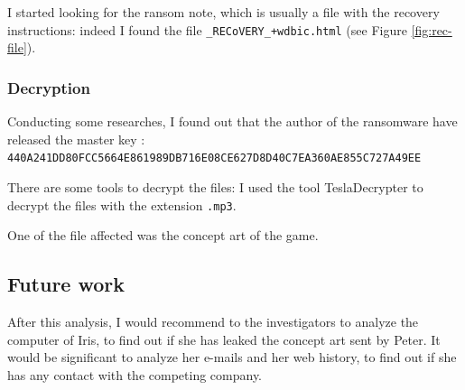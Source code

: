 \documentclass[12pt]{article}
\begin{document}
I started looking for the ransom note, which is usually a file with the recovery instructions: indeed I found the file \texttt{\_RECoVERY\_+wdbic.html} (see Figure \ref{fig:rec-file}).

\subsubsection{Decryption}
Conducting some researches, I found out that the author of the ransomware have released the master key \cite{teslacrypt-masterkey}: \\
\texttt{440A241DD80FCC5664E861989DB716E08CE627D8D40C7EA360AE855C727A49EE}

There are some tools to decrypt the files: I used the tool TeslaDecrypter \cite{tesla-decrypt} to decrypt the files with the extension \texttt{.mp3}.

One of the file affected was the concept art of the game.

\subsection{Future work}

After this analysis, I would recommend to the investigators to analyze the computer of Iris, to find out if she has leaked the concept art sent by Peter. It would be significant to analyze her e-mails and her web history, to find out if she has any contact with the competing company.

\printbibliography[title={References}]
\end{document}
